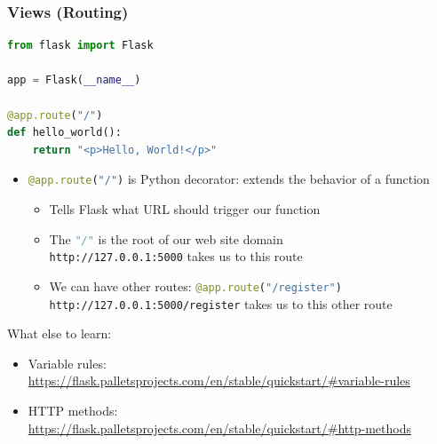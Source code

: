 \documentclass[fleqn,aspectratio=169,10pt]{beamer}
\begin{document}
\begin{frame}[fragile]
  \frametitle{Views (Routing)}
      \vspace*{-2ex}
\begin{lstlisting}[language=Python]
from flask import Flask

app = Flask(__name__)

@app.route("/")
def hello_world():
    return "<p>Hello, World!</p>"
\end{lstlisting}

  \begin{itemize}
    \item \lstinline[language=Python]!@app.route("/")! is Python decorator: extends the behavior of a function
          \begin{itemize}
            \item Tells Flask what URL should trigger our function
            \item The \lstinline[language=Python]!"/"! is the root of our web site domain \\
                  \texttt{http://127.0.0.1:5000} takes us to this route
            \item We can have other routes: \lstinline[language=Python]!@app.route("/register")! \\
                  \texttt{http://127.0.0.1:5000/register} takes us to this other route
          \end{itemize}
  \end{itemize}
  \pause
  \begin{block}{What else to learn:}
    \begin{itemize}
      \item Variable rules: \url{https://flask.palletsprojects.com/en/stable/quickstart/#variable-rules}
      \item HTTP methods: \url{https://flask.palletsprojects.com/en/stable/quickstart/#http-methods}
    \end{itemize}
  \end{block}
\end{frame}
\end{document}
